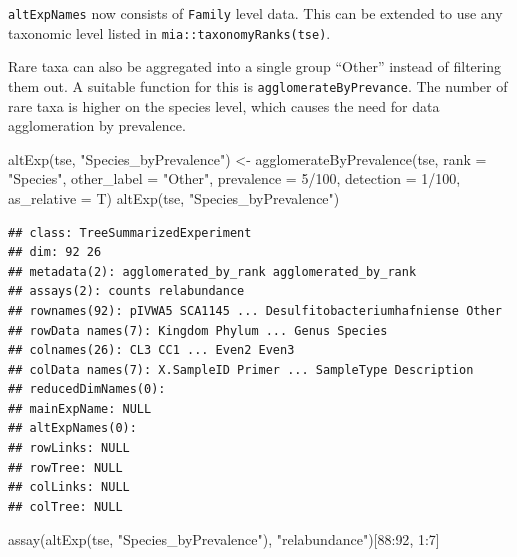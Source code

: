 \documentclass[
]{book}
\newenvironment{Shaded}{\begin{snugshade}}{\end{snugshade}}
\newcommand{\AttributeTok}[1]{\textcolor[rgb]{0.77,0.63,0.00}{#1}}
\newcommand{\DecValTok}[1]{\textcolor[rgb]{0.00,0.00,0.81}{#1}}
\newcommand{\FunctionTok}[1]{\textcolor[rgb]{0.00,0.00,0.00}{#1}}
\newcommand{\NormalTok}[1]{#1}
\newcommand{\OtherTok}[1]{\textcolor[rgb]{0.56,0.35,0.01}{#1}}
\newcommand{\SpecialCharTok}[1]{\textcolor[rgb]{0.00,0.00,0.00}{#1}}
\newcommand{\StringTok}[1]{\textcolor[rgb]{0.31,0.60,0.02}{#1}}
\begin{document}
\texttt{altExpNames} now consists of \texttt{Family} level data. This can be extended to use
any taxonomic level listed in \texttt{mia::taxonomyRanks(tse)}.

Rare taxa can also be aggregated into a single group ``Other'' instead of filtering them out. A suitable function for this is \texttt{agglomerateByPrevance}. The number of rare taxa is higher on the species level, which causes the need for data agglomeration by prevalence.

\begin{Shaded}
\begin{Highlighting}[]
\FunctionTok{altExp}\NormalTok{(tse, }\StringTok{"Species\_byPrevalence"}\NormalTok{) }\OtherTok{\textless{}{-}} \FunctionTok{agglomerateByPrevalence}\NormalTok{(tse, }\AttributeTok{rank =} \StringTok{"Species"}\NormalTok{, }\AttributeTok{other\_label =} \StringTok{"Other"}\NormalTok{, }\AttributeTok{prevalence =} \DecValTok{5}\SpecialCharTok{/}\DecValTok{100}\NormalTok{, }\AttributeTok{detection =} \DecValTok{1}\SpecialCharTok{/}\DecValTok{100}\NormalTok{, }\AttributeTok{as\_relative =}\NormalTok{ T)}
\FunctionTok{altExp}\NormalTok{(tse, }\StringTok{"Species\_byPrevalence"}\NormalTok{)}
\end{Highlighting}
\end{Shaded}

\begin{verbatim}
## class: TreeSummarizedExperiment 
## dim: 92 26 
## metadata(2): agglomerated_by_rank agglomerated_by_rank
## assays(2): counts relabundance
## rownames(92): pIVWA5 SCA1145 ... Desulfitobacteriumhafniense Other
## rowData names(7): Kingdom Phylum ... Genus Species
## colnames(26): CL3 CC1 ... Even2 Even3
## colData names(7): X.SampleID Primer ... SampleType Description
## reducedDimNames(0):
## mainExpName: NULL
## altExpNames(0):
## rowLinks: NULL
## rowTree: NULL
## colLinks: NULL
## colTree: NULL
\end{verbatim}

\begin{Shaded}
\begin{Highlighting}[]
\FunctionTok{assay}\NormalTok{(}\FunctionTok{altExp}\NormalTok{(tse, }\StringTok{"Species\_byPrevalence"}\NormalTok{), }\StringTok{"relabundance"}\NormalTok{)[}\DecValTok{88}\SpecialCharTok{:}\DecValTok{92}\NormalTok{, }\DecValTok{1}\SpecialCharTok{:}\DecValTok{7}\NormalTok{]}
\end{Highlighting}
\end{Shaded}
\end{document}
